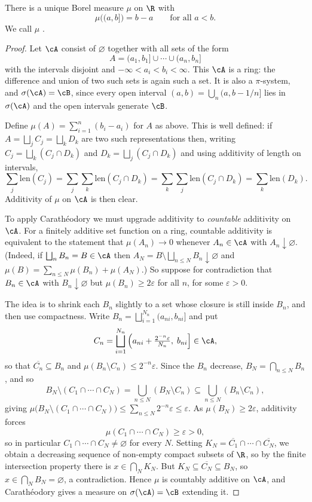 \begin{theorem}\label{pm-thm:lebesgue}
	There is a unique Borel measure $\mu$ on $\R$ with
	$$
	\mu\big( (a,b] \big) = b - a \qquad \text{for all } a < b.
	$$
	We call $\mu$ .
\end{theorem}
\begin{proof}
	Let $\cA$ consist of $\varnothing$ together with all sets of the form
	$$
	A = (a_1, b_1] \cup \cdots \cup (a_n, b_n]
	$$
	with the intervals disjoint and $-\infty < a_i < b_i < \infty$. This $\cA$ is a ring: the difference and union of two such sets is again such a set. It is also a $\pi$-system, and $\sigma(\cA) = \cB$, since every open interval $(a,b) = \bigcup_n (a, b - 1/n]$ lies in $\sigma(\cA)$ and the open intervals generate $\cB$.

	Define $\mu(A) = \sum_{i=1}^n (b_i - a_i)$ for $A$ as above. This is well defined: if $A = \bigsqcup_j C_j = \bigsqcup_k D_k$ are two such representations then, writing $C_j = \bigsqcup_k (C_j \cap D_k)$ and $D_k = \bigsqcup_j (C_j \cap D_k)$ and using additivity of length on intervals,
	$$
	\sum_j \mathrm{len}(C_j) = \sum_j \sum_k \mathrm{len}(C_j \cap D_k) = \sum_k \sum_j \mathrm{len}(C_j \cap D_k) = \sum_k \mathrm{len}(D_k).
	$$
	Additivity of $\mu$ on $\cA$ is then clear.

	To apply Carath\'eodory we must upgrade additivity to \emph{countable} additivity on $\cA$. For a finitely additive set function on a ring, countable additivity is equivalent to the statement that $\mu(A_n) \to 0$ whenever $A_n \in \cA$ with $A_n \downarrow \varnothing$. (Indeed, if $\bigsqcup_n B_n = B \in \cA$ then $A_N = B \setminus \bigsqcup_{n \leq N} B_n \downarrow \varnothing$ and $\mu(B) = \sum_{n \leq N}\mu(B_n) + \mu(A_N)$.) So suppose for contradiction that $B_n \in \cA$ with $B_n \downarrow \varnothing$ but $\mu(B_n) \geq 2\varepsilon$ for all $n$, for some $\varepsilon > 0$.

	The idea is to shrink each $B_n$ slightly to a set whose closure is still inside $B_n$, and then use compactness. Write $B_n = \bigsqcup_{i=1}^{N_n} (a_{ni}, b_{ni}]$ and put
	$$
	C_n = \bigsqcup_{i=1}^{N_n} \Big( a_{ni} + \tfrac{2^{-n}\varepsilon}{N_n},\; b_{ni} \Big] \in \cA,
	$$
	so that $\overline{C_n} \subseteq B_n$ and $\mu(B_n \setminus C_n) \leq 2^{-n}\varepsilon$. Since the $B_n$ decrease, $B_N = \bigcap_{n \leq N} B_n$, and so
	$$
	B_N \setminus (C_1 \cap \cdots \cap C_N) = \bigcup_{n \leq N} (B_N \setminus C_n) \subseteq \bigcup_{n\leq N} (B_n \setminus C_n),
	$$
	giving $\mu\big( B_N \setminus (C_1 \cap \cdots \cap C_N)\big) \leq \sum_{n \leq N} 2^{-n}\varepsilon \leq \varepsilon$. As $\mu(B_N) \geq 2\varepsilon$, additivity forces
	$$
	\mu(C_1 \cap \cdots \cap C_N) \geq \varepsilon > 0,
	$$
	so in particular $C_1 \cap \cdots \cap C_N \neq \varnothing$ for every $N$. Setting $K_N = \overline{C_1} \cap \cdots \cap \overline{C_N}$, we obtain a decreasing sequence of non-empty compact subsets of $\R$, so by the finite intersection property there is $x \in \bigcap_N K_N$. But $K_N \subseteq \overline{C_N} \subseteq B_N$, so $x \in \bigcap_N B_N = \varnothing$, a contradiction. Hence $\mu$ is countably additive on $\cA$, and Carath\'eodory gives a measure on $\sigma(\cA) = \cB$ extending it.


\end{proof}

